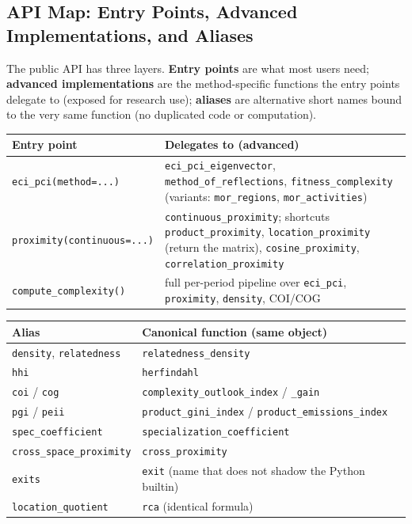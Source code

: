 \documentclass[12pt, a4paper]{article}
\begin{document}
\subsection{API Map: Entry Points, Advanced Implementations, and Aliases}

The public API has three layers. \textbf{Entry points} are what most
users need; \textbf{advanced implementations} are the method-specific
functions the entry points delegate to (exposed for research use);
\textbf{aliases} are alternative short names bound to the very same
function (no duplicated code or computation).

\begin{center}
\renewcommand{\arraystretch}{1.3}
\small
\begin{tabular}{>{\raggedright\arraybackslash}p{5.2cm}>{\raggedright\arraybackslash}p{10.4cm}}
\toprule
\textbf{Entry point} & \textbf{Delegates to (advanced)} \\
\midrule
\texttt{eci\_pci(method=...)} & \texttt{eci\_pci\_eigenvector},
  \texttt{method\_of\_reflections}, \texttt{fitness\_complexity}
  (variants: \texttt{mor\_regions}, \texttt{mor\_activities}) \\
\texttt{proximity(continuous=...)} &
  \texttt{continuous\_proximity}; shortcuts \texttt{product\_proximity}, \texttt{location\_proximity} (return the matrix), \texttt{cosine\_proximity},
  \texttt{correlation\_proximity} \\
\texttt{compute\_complexity()} & full per-period pipeline over
  \texttt{eci\_pci}, \texttt{proximity}, \texttt{density}, COI/COG \\
\bottomrule
\end{tabular}
\end{center}

\begin{center}
\renewcommand{\arraystretch}{1.3}
\begin{tabular}{ll}
\toprule
\textbf{Alias} & \textbf{Canonical function (same object)} \\
\midrule
\texttt{density}, \texttt{relatedness} & \texttt{relatedness\_density} \\
\texttt{hhi}                  & \texttt{herfindahl} \\
\texttt{coi} / \texttt{cog}   & \texttt{complexity\_outlook\_index} / \texttt{\_gain} \\
\texttt{pgi} / \texttt{peii}  & \texttt{product\_gini\_index} / \texttt{product\_emissions\_index} \\
\texttt{spec\_coefficient}    & \texttt{specialization\_coefficient} \\
\texttt{cross\_space\_proximity} & \texttt{cross\_proximity} \\
\texttt{exits} & \texttt{exit} (name that does not shadow the Python builtin) \\
\texttt{location\_quotient}   & \texttt{rca} (identical formula) \\
\bottomrule
\end{tabular}
\end{center}
\end{document}
